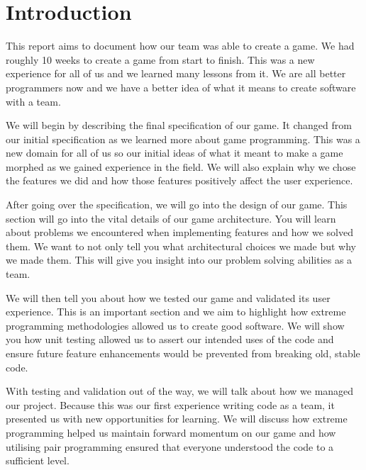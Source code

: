 
\chapter{Introduction}
\label{cha:introduction}


This report aims to document how our team was able to create a
game. We had roughly 10 weeks to create a game from start to
finish. This was a new experience for all of us and we learned many
lessons from it. We are all better programmers now and we have a
better idea of what it means to create software with a team.

We will begin by describing the final specification of our game. It
changed from our initial specification as we learned more about game
programming. This was a new domain for all of us so our initial ideas
of what it meant to make a game morphed as we gained experience in the
field. We will also explain why we chose the features we did and how
those features positively affect the user experience.

After going over the specification, we will go into the design of our
game. This section will go into the vital details of our game
architecture. You will learn about problems we encountered when
implementing features and how we solved them. We want to not only tell
you what architectural choices we made but why we made them. This will
give you insight into our problem solving abilities as a team.

We will then tell you about how we tested our game and validated its
user experience. This is an important section and we aim to highlight
how extreme programming methodologies allowed us to create good
software. We will show you how unit testing allowed us to assert our
intended uses of the code and ensure future feature enhancements would
be prevented from breaking old, stable code.

With testing and validation out of the way, we will talk about how we
managed our project. Because this was our first experience writing
code as a team, it presented us with new opportunities for
learning. We will discuss how extreme programming helped us maintain
forward momentum on our game and how utilising pair programming
ensured that everyone understood the code to a sufficient level.

